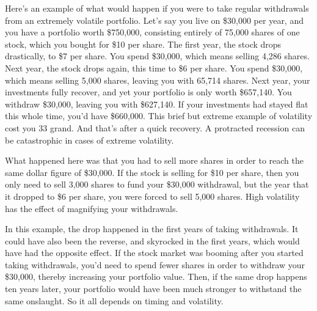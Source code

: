 Here's an example of what would happen if you were to take regular withdrawals from an extremely volatile portfolio. Let's say you live on \$30,000 per year, and you have a portfolio worth \$750,000, consisting entirely of 75,000 shares of one stock, which you bought for \$10 per share. The first year, the stock drops drastically, to \$7 per share. You spend \$30,000, which means selling 4,286 shares. Next year, the stock drops again, this time to \$6 per share. You spend \$30,000, which means selling 5,000 shares, leaving you with 65,714 shares. Next year, your investments fully recover, and yet your portfolio is only worth \$657,140. You withdraw \$30,000, leaving you with \$627,140. If your investments had stayed flat this whole time, you'd have \$660,000. This brief but extreme example of volatility cost you 33 grand. And that's after a quick recovery. A protracted recession can be catastrophic in cases of extreme volatility.

\begin{figure}
\centering
{}
\end{figure}

What happened here was that you had to sell more shares in order to reach the same dollar figure of \$30,000. If the stock is selling for \$10 per share, then you only need to sell 3,000 shares to fund your \$30,000 withdrawal, but the year that it dropped to \$6 per share, you were forced to sell 5,000 shares. High volatility has the effect of magnifying your withdrawals.

In this example, the drop happened in the first years of taking withdrawals. It could have also been the reverse, and skyrocked in the first years, which would have had the opposite effect. If the stock market was booming after you started taking withdrawals, you'd need to spend fewer shares in order to withdraw your \$30,000, thereby increasing your portfolio value. Then, if the same drop happens ten years later, your portfolio would have been much stronger to withstand the same onslaught. So it all depends on timing and volatility.

